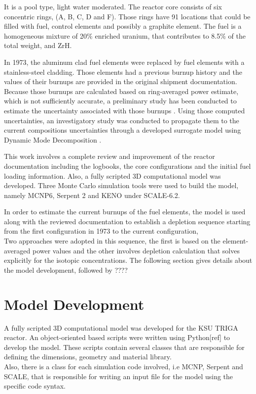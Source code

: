 \documentclass[review]{elsarticle}
\begin{document}
It is a pool type, light water moderated. The reactor core consists of six concentric rings, (A, B, C, D and F). Those rings have 91 locations that could be filled with fuel, control elements and possibly a graphite element.
The fuel is a homogeneous mixture of 20\% enriched uranium, that contributes to 8.5\% of the total weight, and ZrH.

In 1973, the aluminum clad fuel elements  were replaced by fuel elements with a stainless-steel cladding. Those elements had a previous burnup history and the values of their burnups are provided in the original shipment documentation. 
Because those burnups are calculated based on ring-averaged power estimate, which is not sufficiently accurate, a preliminary study has been conducted to estimate the uncertainty associated with those burnups \cite{gairola2017estimating}. Using those computed uncertainties, an investigatory study was conducted to propagate them to the current compositions uncertainties through a developed surrogate model using Dynamic Mode Decomposition \cite{recent paper}.

This work involves a complete review and improvement of the reactor documentation including the logbooks, the core configurations and the initial fuel loading information.
Also, a fully scripted 3D computational model was developed. Three Monte Carlo simulation tools were used to build the model, namely MCNP6, Serpent 2 and KENO under SCALE-6.2.

In order to estimate the current burnups of the fuel elements, the model is used along with the reviewed documentation to establish a depletion sequence starting from the first configuration in 1973 to the current configuration,  \\
Two approaches were adopted in this sequence, the first is based on the element-averaged power values and the other involves depletion calculation that solves explicitly for the isotopic concentrations.
The following section gives details about the model development, followed by ????


\section{Model Development}
 
 A fully scripted 3D computational model was developed for the KSU TRIGA reactor. An object-oriented based scripts were written using Python[ref] to develop the model. These scripts contain several classes that are responsible for defining the dimensions, geometry and material library. \\
 Also, there is a class for each simulation code involved, i.e MCNP, Serpent and SCALE, that is responsible for writing an input file for the model using the specific code syntax.
 
\end{document}
